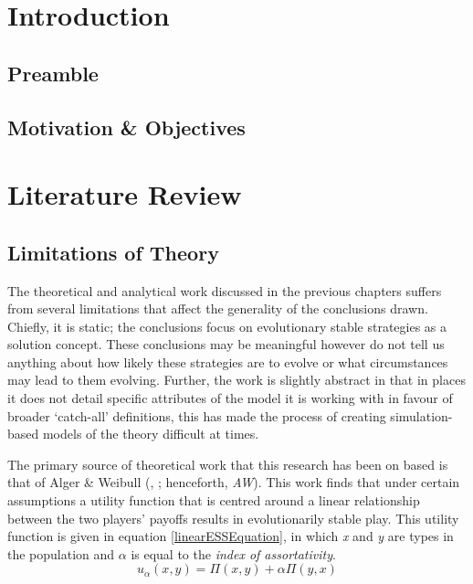 \documentclass[11pt]{book}
\newcommand*{\np}{\par\noindent\newline}
\begin{document}

\tableofcontents
\newpage
\listoffigures
\chapter{Introduction}
\section{Preamble}
\section{Motivation \& Objectives}

\chapter{Literature Review}

\section{Limitations of Theory}
The theoretical and analytical work discussed in the previous chapters suffers from several limitations that affect the generality of the conclusions drawn. 
Chiefly, it is static; the conclusions focus on evolutionary stable strategies as a solution concept.
These conclusions may be meaningful however do not tell us anything about how likely these strategies are to evolve or what circumstances may lead to them evolving.
Further, the work is slightly abstract in that in places it does not detail specific attributes of the model it is working with in favour of broader `catch-all' definitions,
this has made the process of creating simulation-based models of the theory difficult at times.

\np The primary source of theoretical work that this research has been on based is that of Alger \& Weibull (\citeyear{alger_generalization_2012}, \citeyear{alger_homo_2013}; henceforth, \textit{AW}).
This work finds that under certain assumptions a utility function that is centred around a linear relationship between the two players' payoffs results in evolutionarily stable play.
This utility function is given in equation \ref{linearESSEquation}, in which \textit{x} and \textit{y} are types in the population and $\alpha$ is equal to the \textit{index of assortativity}.
\begin{equation}
	\label{linearESSEquation}
	u_\alpha(x, y) = \Pi(x,y) + \alpha\Pi(y,x)
\end{equation}
\end{document}
